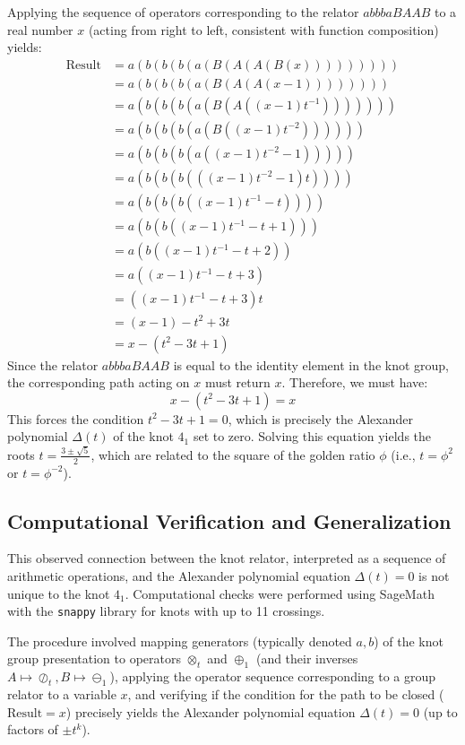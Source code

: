 \documentclass{article}[a4paper,12pt]
\begin{document}
Applying the sequence of operators corresponding to the relator $abbbaBAAB$ to a real number $x$ (acting from right to left, consistent with function composition) yields:
\begin{align*}
    \text{Result} &= a(b(b(b(a(B(A(A(B(x))))))))) \\
    &= a(b(b(b(a(B(A(A(x - 1)))))))) \\
    &= a(b(b(b(a(B(A((x - 1)t^{-1}))))))) \\
    &= a(b(b(b(a(B((x - 1)t^{-2})))))) \\
    &= a(b(b(b(a((x - 1)t^{-2} - 1))))) \\
    &= a(b(b(b(((x - 1)t^{-2} - 1)t)))) \\
    &= a(b(b(b((x - 1)t^{-1} - t)))) \\
    &= a(b(b((x - 1)t^{-1} - t + 1))) \\
    &= a(b((x - 1)t^{-1} - t + 2)) \\
    &= a((x - 1)t^{-1} - t + 3) \\
    &= ((x - 1)t^{-1} - t + 3)t \\
    &= (x - 1) - t^2 + 3t \\
    &= x - (t^2 - 3t + 1)
\end{align*}
Since the relator $abbbaBAAB$ is equal to the identity element in the knot group, the corresponding path acting on $x$ must return $x$. Therefore, we must have:
\[
x - (t^2 - 3t + 1) = x
\]
This forces the condition $t^2 - 3t + 1 = 0$, which is precisely the Alexander polynomial $\Delta(t)$ of the knot $4_1$ set to zero. Solving this equation yields the roots $t = \frac{3 \pm \sqrt{5}}{2}$, which are related to the square of the golden ratio $\phi$ (i.e., $t = \phi^2$ or $t = \phi^{-2}$).

\subsection{Computational Verification and Generalization}

This observed connection between the knot relator, interpreted as a sequence of arithmetic operations, and the Alexander polynomial equation $\Delta(t)=0$ is not unique to the knot $4_1$. Computational checks were performed using SageMath with the \texttt{snappy} library for knots with up to 11 crossings.

The procedure involved mapping generators (typically denoted $a, b$) of the knot group presentation to operators $\otimes_t$ and $\oplus_1$ (and their inverses $A \mapsto \oslash_t, B \mapsto \ominus_1$), applying the operator sequence corresponding to a group relator to a variable $x$, and verifying if the condition for the path to be closed ($\text{Result} = x$) precisely yields the Alexander polynomial equation $\Delta(t)=0$ (up to factors of $\pm t^k$).
\end{document}
